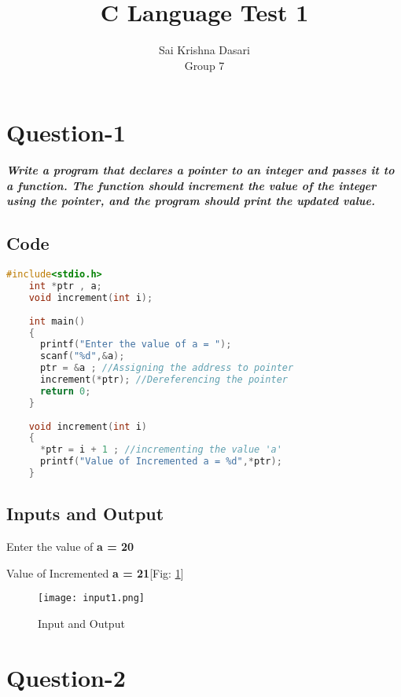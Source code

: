 \documentclass[12pt]{article}
\title{C Language Test 1 }
\author{Sai Krishna Dasari\\Group 7}
\begin{document}
\maketitle %
\pagebreak
\tableofcontents %
\clearpage
\section{Question-1}

\emph{\textbf{Write a program that declares a pointer to an integer and passes it to a function. The function should increment the value of the integer using the pointer, and the program should print the updated value.}}


\subsection{Code}
\begin{lstlisting}[language=C]  
	#include<stdio.h>
	int *ptr , a;
	void increment(int i);
	
	int main()
	{
	  printf("Enter the value of a = ");
	  scanf("%d",&a);
	  ptr = &a ; //Assigning the address to pointer
	  increment(*ptr); //Dereferencing the pointer
	  return 0;
	}
	
	void increment(int i)
	{
  	  *ptr = i + 1 ; //incrementing the value 'a'
  	  printf("Value of Incremented a = %d",*ptr);
	}

\end{lstlisting}

\subsection{Inputs and Output}


	\begin{center}

	Enter the value of \textbf{a = 20}
  

    Value of Incremented \textbf{a = 21}[Fig: \ref{fig_input_output}]

	\end{center}
\pagebreak
\begin{figure}[h]
\centering
\texttt{[image: input1.png]}
\caption{Input and Output }
\label{fig_input_output}
\end{figure}

\section{Question-2}
\end{document}
